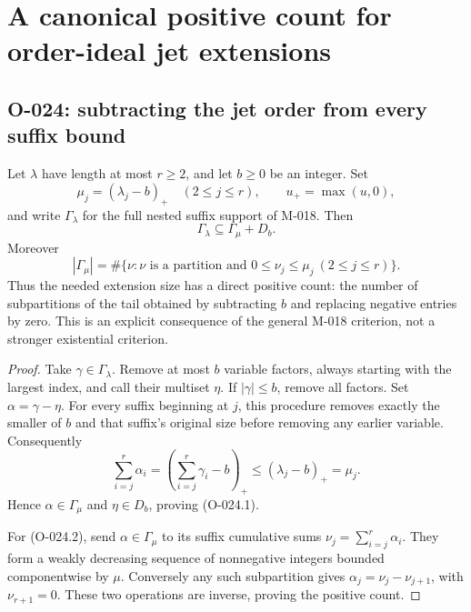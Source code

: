 \section{A canonical positive count for order-ideal jet extensions}

\subsection{O-024: subtracting the jet order from every suffix bound}
Let $\lambda$ have length at most $r\geq2$, and let
$b\geq0$ be an integer. Set
\[
           \mu_j=(\lambda_j-b)_+\quad(2\leq j\leq r),
            \qquad u_+=\max(u,0),
\]
and write $\Gamma_\lambda$ for the full nested suffix
support of M-018. Then
\[
                         \Gamma_\lambda\subseteq\Gamma_\mu+D_b.
                                                               \tag{O-024.1}
\]
Moreover
\[
        |\Gamma_\mu|
            =\#\{\nu:\nu\text{ is a partition and }
                         0\leq\nu_j\leq\mu_j\ (2\leq j\leq r)\}.
                                                               \tag{O-024.2}
\]
Thus the needed extension size has a direct positive count:
the number of subpartitions of the tail obtained by
subtracting $b$ and replacing negative entries by zero.
This is an explicit consequence of the general M-018
criterion, not a stronger existential criterion.

\begin{proof}
Take $\gamma\in\Gamma_\lambda$. Remove at most $b$
variable factors, always starting with the largest index,
and call their multiset $\eta$. If $|\gamma|\leq b$,
remove all factors. Set $\alpha=\gamma-\eta$.
For every suffix beginning at $j$, this procedure removes
exactly the smaller of $b$ and that suffix's original
size before removing any earlier variable. Consequently
\[
         \sum_{i=j}^r\alpha_i
                =\left(\sum_{i=j}^r\gamma_i-b\right)_+
                \leq(\lambda_j-b)_+=\mu_j.
                                                               \tag{O-024.3}
\]
Hence $\alpha\in\Gamma_\mu$ and $\eta\in D_b$,
proving (O-024.1).

For (O-024.2), send $\alpha\in\Gamma_\mu$ to its
suffix cumulative sums
$\nu_j=\sum_{i=j}^r\alpha_i$.
They form a weakly decreasing sequence of nonnegative
integers bounded componentwise by $\mu$.
Conversely any such subpartition gives
$\alpha_j=\nu_j-\nu_{j+1}$, with $\nu_{r+1}=0$.
These two operations are inverse, proving the positive count.
\end{proof}

